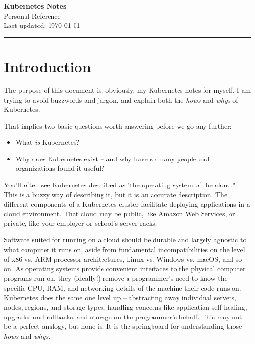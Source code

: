 \documentclass[11pt, a4paper]{article}
\begin{document}
\begin{center}
    {\LARGE \textbf{Kubernetes Notes}} \\[0.5em]
    {\large Personal Reference} \\[0.3em]
    {\small Last updated: \today}
\end{center}

\tableofcontents
\bigskip
\hrule
\bigskip

\section{Introduction}

The purpose of this document is, obviously, my Kubernetes notes for myself. I am trying to avoid buzzwords and jargon, and explain both the \textit{hows} and \textit{whys} of Kubernetes. 

That implies two basic questions worth answering before we go any further:

\begin{itemize}
\item What \textit{is} Kubernetes?
\item Why does Kubernetes exist -- and why have so many people and organizations found it useful?
\end{itemize}

You'll often see Kubernetes described as "the operating system of the cloud." This is a buzzy way of describing it, but it is an accurate description. The different components of a Kubernetes cluster facilitate deploying applications in a cloud environment. That cloud may be public, like Amazon Web Services, or private, like your employer or school's server racks. 

Software suited for running on a cloud should be durable and largely agnostic to what computer it runs on, aside from fundamental incompatibilities on the level of x86 vs. ARM processor architectures, Linux vs. Windows vs. macOS, and so on. As operating systems provide convenient interfaces to the physical computer programs run on, they (ideally!) remove a programmer's need to know the specific CPU, RAM, and networking details of the machine their code runs on. Kubernetes does the same one level up -- abstracting away individual servers, nodes, regions, and storage types, handling concerns like application self-healing, upgrades and rollbacks, and storage on the programmer's behalf. This may not be a perfect analogy, but none is. It is the springboard for understanding those \textit{hows} and \textit{whys}.
\end{document}
